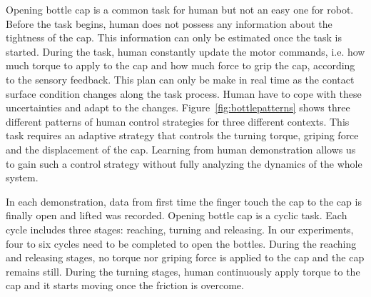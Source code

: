 
Opening bottle cap is a common task for human but not an easy one for robot. Before the task begins, human does not possess any information about the tightness of the cap. This information can only be estimated once the task is started.
During the task, human constantly update the motor commands, i.e. how much torque to apply to the cap and how much force to grip the cap, according to the sensory feedback. This plan can only be make in real time as the contact surface condition changes along the task process.  Human have to cope with these uncertainties and adapt to the changes. Figure~\ref{fig:bottlepatterns} shows three different patterns of human control strategies for three different contexts. This task requires an adaptive strategy that controls the turning torque, griping force and the displacement of the cap. Learning from human demonstration allows us to gain such a control strategy without fully analyzing the dynamics of the whole system.


In each demonstration, data from first time the finger touch the cap to the cap is finally open and lifted was recorded. Opening bottle cap is a cyclic task. Each cycle includes three stages: reaching, turning and releasing. In our experiments, four to six cycles need to be completed to open the bottles. During the reaching and releasing stages, no torque nor griping force is applied to the cap and the cap remains still. During the turning stages, human continuously apply torque to the cap and it starts moving once the friction is overcome.

